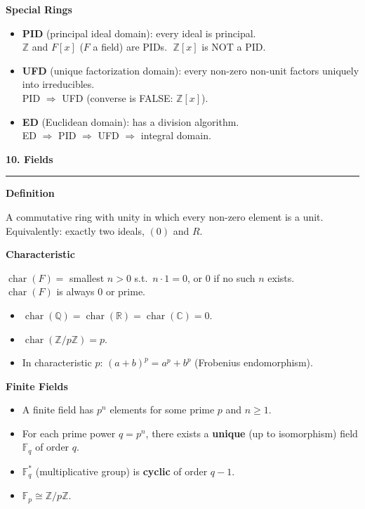 \documentclass[10pt,twocolumn]{article}
\newcommand{\sect}[1]{\medskip\noindent\textbf{\large #1}\medskip\hrule\smallskip}
\newcommand{\subsect}[1]{\smallskip\noindent\textbf{#1}\par}
\begin{document}
\subsect{Special Rings}
\begin{itemize}[nosep,leftmargin=*]
\item \textbf{PID} (principal ideal domain): every ideal is principal.\\
  $\mathbb{Z}$ and $F[x]$ ($F$ a field) are PIDs. $\;\mathbb{Z}[x]$ is NOT a PID.
\item \textbf{UFD} (unique factorization domain): every non-zero non-unit factors uniquely into irreducibles.\\
  PID $\Rightarrow$ UFD (converse is FALSE: $\mathbb{Z}[x]$).
\item \textbf{ED} (Euclidean domain): has a division algorithm.\\
  ED $\Rightarrow$ PID $\Rightarrow$ UFD $\Rightarrow$ integral domain.
\end{itemize}

\sect{10. Fields}

\subsect{Definition}
A commutative ring with unity in which every non-zero element is a unit.\\
Equivalently: exactly two ideals, $(0)$ and $R$.

\subsect{Characteristic}
$\operatorname{char}(F)=$ smallest $n>0$ s.t.\ $n\cdot 1=0$, or $0$ if no such $n$ exists.\\
$\operatorname{char}(F)$ is always $0$ or prime.
\begin{itemize}[nosep,leftmargin=*]
\item $\operatorname{char}(\mathbb{Q})=\operatorname{char}(\mathbb{R})=\operatorname{char}(\mathbb{C})=0$.
\item $\operatorname{char}(\mathbb{Z}/p\mathbb{Z})=p$.
\item In characteristic $p$: $(a+b)^p = a^p+b^p$ (Frobenius endomorphism).
\end{itemize}

\subsect{Finite Fields}
\begin{itemize}[nosep,leftmargin=*]
\item A finite field has $p^n$ elements for some prime $p$ and $n\ge 1$.
\item For each prime power $q=p^n$, there exists a \textbf{unique} (up to isomorphism) field $\mathbb{F}_q$ of order $q$.
\item $\mathbb{F}_q^*$ (multiplicative group) is \textbf{cyclic} of order $q-1$.
\item $\mathbb{F}_p\cong\mathbb{Z}/p\mathbb{Z}$.
\end{itemize}
\end{document}
